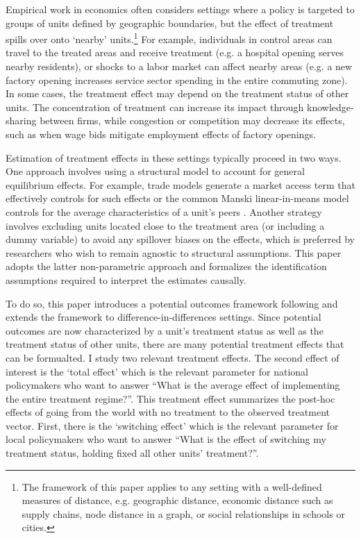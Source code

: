 \documentclass[11pt]{article}
\begin{document}
Empirical work in economics often considers settings where a policy is targeted to groups of units defined by geographic boundaries, but the effect of treatment spills over onto `nearby' units.\footnote{The framework of this paper applies to any setting with a well-defined measures of distance, e.g. geographic distance, economic distance such as supply chains, node distance in a graph, or social relationships in schools or cities.} For example, individuals in control areas can travel to the treated areas and receive treatment (e.g. a hospital opening serves nearby residents), or shocks to a labor market can affect nearby areas (e.g. a new factory opening increases service sector spending in the entire commuting zone). In some cases, the treatment effect may depend on the treatment status of other units. The concentration of treatment can increase its impact through knowledge-sharing between firms, while congestion or competition may decrease its effects, such as when wage bids mitigate employment effects of factory openings.

Estimation of treatment effects in these settings typically proceed in two ways. One approach involves using a structural model to account for general equilibrium effects. For example, trade models generate a market access term that effectively controls for such effects \citep{Donaldson_Hornbeck_2016} or the common Manski linear-in-means model controls for the average characteristics of a unit's peers \citep{manski1993identification,goldsmith2013social}. Another strategy involves excluding units located close to the treatment area (or including a dummy variable) to avoid any spillover biases on the effects, which is preferred by researchers who wish to remain agnostic to structural assumptions. This paper adopts the latter non-parametric approach and formalizes the identification assumptions required to interpret the estimates causally. 

To do so, this paper introduces a potential outcomes framework following \citet{vazquez2022identification} and extends the framework to difference-in-differences settings. Since potential outcomes are now characterized by a unit's treatment status as well as the treatment status of other units, there are many potential treatment effects that can be formualted. I study two relevant treatment effects. The second effect of interest is the `total effect' which is the relevant parameter for national policymakers who want to answer ``What is the average effect of implementing the entire treatment regime?''. This treatment effect summarizes the post-hoc effects of going from the world with no treatment to the observed treatment vector. First, there is the `switching effect' which is the relevant parameter for local policymakers who want to answer ``What is the effect of switching my treatment status, holding fixed all other units' treatment?''.
\end{document}
